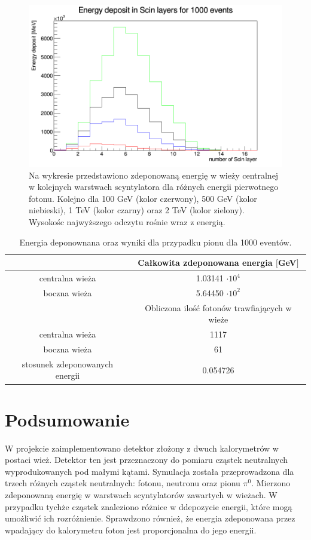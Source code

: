 \documentclass[11pt]{article}
\begin{document}
\begin{figure}
\begin{center}
\includegraphics[scale=0.5]{gam.png}
\caption{Na wykresie przedstawiono zdeponowaną energię w wieży centralnej w 
			kolejnych warstwach scyntylatora dla różnych energii pierwotnego fotonu. Kolejno dla
			100 GeV (kolor czerwony), 500 GeV (kolor niebieski), 1 TeV (kolor czarny) oraz 2 TeV (kolor zielony).
			Wysokośc najwyższego odczytu rośnie wraz z energią. }\label{w3}
\end{center}
\end{figure}

\begin{table}
\caption{Energia deponownana oraz wyniki dla przypadku pionu dla 1000 eventów.}\label{t2}
\centering
\begin{tabular}{c|c}
& Całkowita zdeponowana energia $[$GeV$]$ \\ \hline  
centralna wieża & 1.03141 $\cdot 10^{4}$ \\ 
boczna wieża & 5.64450 $\cdot 10^{2}$ \\ \hline
& Obliczona ilość fotonów trawfiających w wieże \\ \hline
centralna wieża & 1117 \\
boczna wieża & 61 \\ \hline \hline
stosunek zdeponowanych energii & 0.054726 \\ 
\end{tabular}
\end{table}
\section*{Podsumowanie}
W projekcie zaimplementowano detektor złożony z dwuch kalorymetrów w postaci wież. Detektor ten jest przeznaczony do pomiaru 
cząstek neutralnych wyprodukowanych pod małymi kątami. Symulacja została przeprowadzona dla trzech różnych cząstek neutralnych: fotonu, neutronu oraz pionu $\pi^0$. 
Mierzono zdeponowaną energię w warstwach scyntylatorów zawartych w wieżach. W przypadku tychże cząstek znaleziono różnice w ddepozycie energii, które mogą umożliwić 
ich rozróżnienie. Sprawdzono również, że energia zdeponowana przez wpadający do kalorymetru foton jest proporcjonalna do jego energii. 
\end{document}
